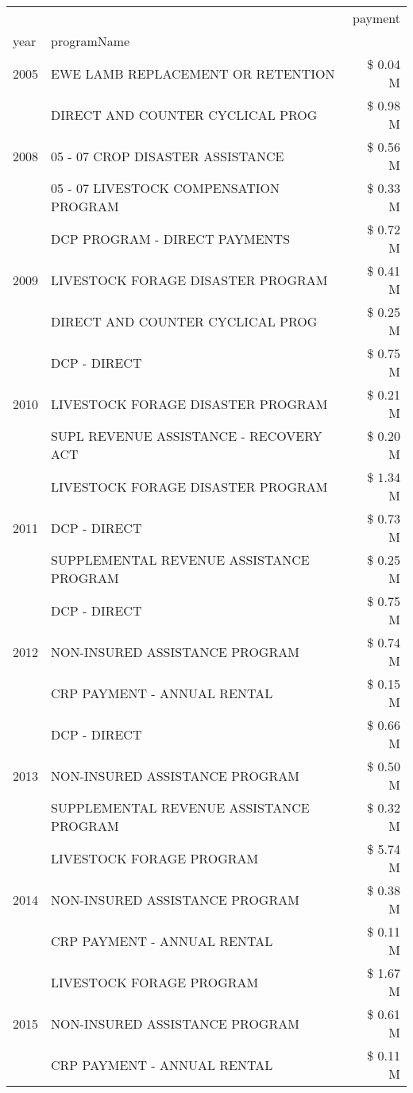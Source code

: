 \begin{tabular}{llr}
\toprule
 &  & payment \\
year & programName &  \\
\midrule
2005 & EWE LAMB REPLACEMENT OR RETENTION & \$ 0.04 M \\
\cline{1-3}
\multirow[t]{3}{*}{2008} & DIRECT AND COUNTER CYCLICAL PROG & \$ 0.98 M \\
 & 05 - 07 CROP DISASTER ASSISTANCE & \$ 0.56 M \\
 & 05 - 07 LIVESTOCK COMPENSATION PROGRAM & \$ 0.33 M \\
\cline{1-3}
\multirow[t]{3}{*}{2009} & DCP PROGRAM - DIRECT PAYMENTS & \$ 0.72 M \\
 & LIVESTOCK FORAGE DISASTER  PROGRAM & \$ 0.41 M \\
 & DIRECT AND COUNTER CYCLICAL PROG & \$ 0.25 M \\
\cline{1-3}
\multirow[t]{3}{*}{2010} & DCP - DIRECT & \$ 0.75 M \\
 & LIVESTOCK FORAGE DISASTER PROGRAM & \$ 0.21 M \\
 & SUPL REVENUE ASSISTANCE - RECOVERY ACT & \$ 0.20 M \\
\cline{1-3}
\multirow[t]{3}{*}{2011} & LIVESTOCK FORAGE DISASTER PROGRAM & \$ 1.34 M \\
 & DCP - DIRECT & \$ 0.73 M \\
 & SUPPLEMENTAL REVENUE ASSISTANCE PROGRAM & \$ 0.25 M \\
\cline{1-3}
\multirow[t]{3}{*}{2012} & DCP - DIRECT & \$ 0.75 M \\
 & NON-INSURED ASSISTANCE PROGRAM & \$ 0.74 M \\
 & CRP PAYMENT - ANNUAL RENTAL & \$ 0.15 M \\
\cline{1-3}
\multirow[t]{3}{*}{2013} & DCP - DIRECT & \$ 0.66 M \\
 & NON-INSURED ASSISTANCE PROGRAM & \$ 0.50 M \\
 & SUPPLEMENTAL REVENUE ASSISTANCE PROGRAM & \$ 0.32 M \\
\cline{1-3}
\multirow[t]{3}{*}{2014} & LIVESTOCK FORAGE PROGRAM & \$ 5.74 M \\
 & NON-INSURED ASSISTANCE PROGRAM & \$ 0.38 M \\
 & CRP PAYMENT - ANNUAL RENTAL & \$ 0.11 M \\
\cline{1-3}
\multirow[t]{3}{*}{2015} & LIVESTOCK FORAGE PROGRAM & \$ 1.67 M \\
 & NON-INSURED ASSISTANCE PROGRAM & \$ 0.61 M \\
 & CRP PAYMENT - ANNUAL RENTAL & \$ 0.11 M \\

\end{tabular}
